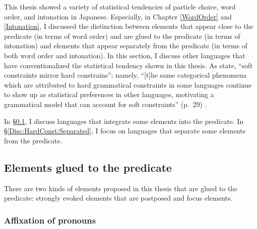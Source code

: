 This thesis showed a variety of statistical tendencies of particle choice, word order, and intonation in Japanese.
Especially, in Chapter \ref{WordOrder} and \ref{Intonation},
I discussed the distinction between
elements that appear close to the predicate (in terms of word order) and are glued to the predicate (in terms of intonation) and
elements that appear separately from the predicate (in terms of both word order and intonation).
In this section,
I discuss other languages that have conventionalized the statistical tendency shown in this thesis.
As  state,
``soft constraints mirror hard constrains'';
namely, ``[t]he same categorical phenomena which are attributed to hard grammatical constraints in some languages continue to show up as statistical preferences in other languages,
motivating a grammatical model that can account for soft constraints'' (p.~29)
\cite[see also][]{givon79,bybeehopper01}.

In \S \ref{Disc:HardConst:Integrated},
I discuss languages that
integrate some elements into the predicate.
In \S \ref{Disc:HardConst:Separated},
I focus on languages that
separate some elements from the predicate.

\subsection{Elements glued to the predicate}\label{Disc:HardConst:Integrated}

There are two kinds of elements proposed in this thesis
that are glued to the predicate:
strongly evoked elements that are postposed and
focus elements.

\subsubsection{Affixation of pronouns}

